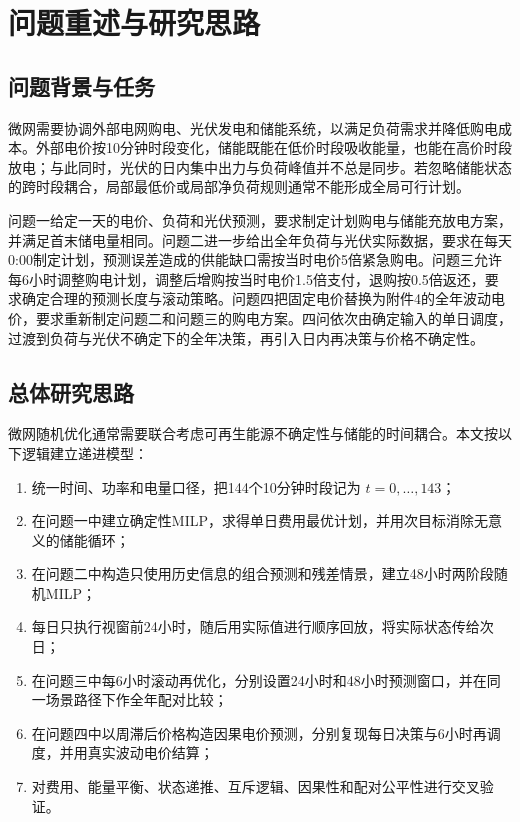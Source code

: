 \documentclass[UTF8,12pt,a4paper]{ctexart}
\begin{document}
\newpage

\section{问题重述与研究思路}

\subsection{问题背景与任务}

微网需要协调外部电网购电、光伏发电和储能系统，以满足负荷需求并降低购电成本。外部电价按10分钟时段变化，储能既能在低价时段吸收能量，也能在高价时段放电；与此同时，光伏的日内集中出力与负荷峰值并不总是同步。若忽略储能状态的跨时段耦合，局部最低价或局部净负荷规则通常不能形成全局可行计划。

问题一给定一天的电价、负荷和光伏预测，要求制定计划购电与储能充放电方案，并满足首末储电量相同。问题二进一步给出全年负荷与光伏实际数据，要求在每天0:00制定计划，预测误差造成的供能缺口需按当时电价5倍紧急购电。问题三允许每6小时调整购电计划，调整后增购按当时电价1.5倍支付，退购按0.5倍返还，要求确定合理的预测长度与滚动策略。问题四把固定电价替换为附件4的全年波动电价，要求重新制定问题二和问题三的购电方案。四问依次由确定输入的单日调度，过渡到负荷与光伏不确定下的全年决策，再引入日内再决策与价格不确定性。

\subsection{总体研究思路}

微网随机优化通常需要联合考虑可再生能源不确定性与储能的时间耦合\cite{liang2014stochastic}。本文按以下逻辑建立递进模型：

\begin{enumerate}
  \item 统一时间、功率和电量口径，把144个10分钟时段记为 $t=0,\ldots,143$；
  \item 在问题一中建立确定性MILP，求得单日费用最优计划，并用次目标消除无意义的储能循环；
  \item 在问题二中构造只使用历史信息的组合预测和残差情景，建立48小时两阶段随机MILP；
  \item 每日只执行视窗前24小时，随后用实际值进行顺序回放，将实际状态传给次日；
  \item 在问题三中每6小时滚动再优化，分别设置24小时和48小时预测窗口，并在同一场景路径下作全年配对比较；
  \item 在问题四中以周滞后价格构造因果电价预测，分别复现每日决策与6小时再调度，并用真实波动电价结算；
  \item 对费用、能量平衡、状态递推、互斥逻辑、因果性和配对公平性进行交叉验证。
\end{enumerate}
\end{document}

